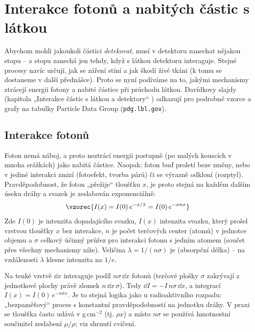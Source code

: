 \section{Interakce fotonů a nabitých částic s látkou}

Abychom mohli jakoukoli částici \emph{detekovat}, musí v detektoru zanechat
nějakou stopu – a stopu zanechá jen tehdy, když s látkou detektoru
interaguje. Stejné procesy navíc určují, jak se záření stíní a jak škodí
živé tkáni (k tomu se dostaneme v další přednášce). Proto se nyní podíváme
na to, jakými mechanismy ztrácejí energii fotony a nabité částice při
průchodu látkou. Davídkovy slajdy (kapitola „Interakce částic s látkou
a detektory`` ) odkazují pro podrobné vzorce a grafy na tabulky Particle
Data Group (\texttt{pdg.lbl.gov}).

\subsection{Interakce fotonů}

Foton nemá náboj, a proto neztrácí energii postupně (po malých kouscích
v mnoha srážkách) jako nabitá částice. Naopak: foton buď proletí beze
změny, nebo v jediné interakci zmizí (fotoefekt, tvorba párů) či se
výrazně odkloní (rozptyl). Pravděpodobnost, že foton „přežije`` tloušťku
\(x\), je proto stejná na každém dalším úseku dráhy a svazek je zeslabován
exponenciálně:
\[
  \vzorec{I(x) = I(0)\,e^{-x/\lambda} = I(0)\,e^{-x n\sigma}}
\]
Zde \(I(0)\) je intenzita dopadajícího svazku, \(I(x)\) intenzita svazku,
který prošel vrstvou tloušťky \(x\) bez interakce, \(n\) je počet terčových
center (atomů) v jednotce objemu a \(\sigma\) celkový účinný průřez pro
interakci fotonu s jedním atomem (součet přes všechny mechanismy níže).
Veličina
\(\lambda = 1/(n\sigma)\) je  (absorpční délka)
– na vzdálenosti \(\lambda\) klesne intenzita na \(1/e\).

\begin{vysvetleni}
Na tenké vrstvě \(\dd x\) interaguje podíl \(n\sigma\,\dd x\) fotonů (terčové
plošky \(\sigma\) zakrývají z jednotkové plochy právě zlomek
\(n\,\dd x\,\sigma\)). Tedy \(\dd I = -I\,n\sigma\,\dd x\), a integrací
\(I(x) = I(0)\,e^{-n\sigma x}\). Je to stejná logika jako u radioaktivního
rozpadu: „bezpaměťový`` proces s konstantní pravděpodobností na jednotku
dráhy. V praxi se tloušťka často udává v g\,cm\(^{-2}\) (tj. \(\rho x\))
a místo \(n\sigma\) se používá hmotnostní součinitel zeslabení
\(\mu/\rho\); viz shrnutí cvičení.
\end{vysvetleni}

